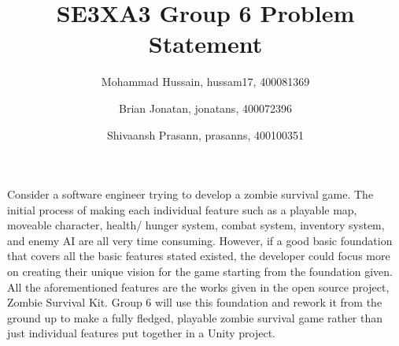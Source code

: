 \documentclass[12pt]{article}
\title{SE3XA3 Group 6 Problem Statement}
\author{Mohammad Hussain, hussam17, 400081369\\
		\and 
		Brian Jonatan, jonatans, 400072396
		\and
		Shivaansh Prasann, prasanns, 400100351}
\begin{document}
\maketitle

Consider a software engineer trying to develop a zombie survival game.
The initial process of making each individual feature such as a playable map, 
moveable character, health/ hunger system, combat system, inventory system, and 
enemy AI are all very time consuming. However, if a good basic foundation that 
covers all the basic features stated existed, the developer could focus more on 
creating their unique vision for the game starting from the foundation given. 
All the aforementioned features are the works given in the open source project, Zombie Survival Kit.
Group 6 will use this foundation and rework it from the ground up to make a fully fledged, playable 
zombie survival game rather than just individual features put together in a Unity project.
\end{document}
